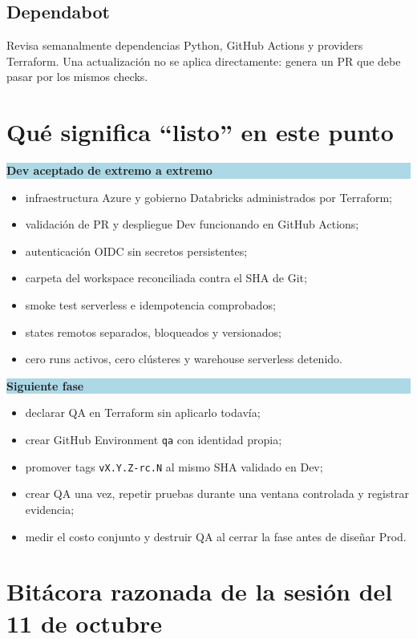 \documentclass[11pt,a4paper]{article}
\newcommand{\estado}[1]{\colorbox{lightblue}{\strut\textbf{#1}}}
\begin{document}
\subsection{Dependabot}

Revisa semanalmente dependencias Python, GitHub Actions y providers Terraform. Una actualización no se
aplica directamente: genera un PR que debe pasar por los mismos checks.

\section{Qué significa ``listo'' en este punto}

\estado{Dev aceptado de extremo a extremo}

\begin{itemize}
  \item infraestructura Azure y gobierno Databricks administrados por Terraform;
  \item validación de PR y despliegue Dev funcionando en GitHub Actions;
  \item autenticación OIDC sin secretos persistentes;
  \item carpeta del workspace reconciliada contra el SHA de Git;
  \item smoke test serverless e idempotencia comprobados;
  \item states remotos separados, bloqueados y versionados;
  \item cero runs activos, cero clústeres y warehouse serverless detenido.
\end{itemize}

\estado{Siguiente fase}

\begin{itemize}
  \item declarar QA en Terraform sin aplicarlo todavía;
  \item crear GitHub Environment \texttt{qa} con identidad propia;
  \item promover tags \texttt{vX.Y.Z-rc.N} al mismo SHA validado en Dev;
  \item crear QA una vez, repetir pruebas durante una ventana controlada y registrar evidencia;
  \item medir el costo conjunto y destruir QA al cerrar la fase antes de diseñar Prod.
\end{itemize}

\section{Bitácora razonada de la sesión del 11 de octubre}
\end{document}
